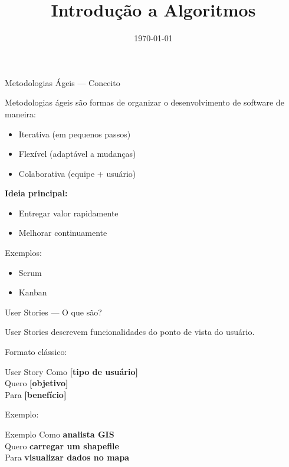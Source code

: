\documentclass{beamer}
\title{Introdução a Algoritmos}
\date{\today}
\begin{document}
    


\begin{frame}{Metodologias Ágeis — Conceito}
    
    Metodologias ágeis são formas de organizar o desenvolvimento de software de maneira:
    
    \begin{itemize}
        \item Iterativa (em pequenos passos)
        \item Flexível (adaptável a mudanças)
        \item Colaborativa (equipe + usuário)
    \end{itemize}
    
    \vspace{0.4cm}
    
    \textbf{Ideia principal:}
    
    \begin{itemize}
        \item Entregar valor rapidamente
        \item Melhorar continuamente
    \end{itemize}
    
    \vspace{0.4cm}
    
    Exemplos:
    
    \begin{itemize}
        \item Scrum
        \item Kanban
    \end{itemize}
    
\end{frame}

\begin{frame}{User Stories — O que são?}
    
    User Stories descrevem funcionalidades do ponto de vista do usuário.
    
    \vspace{0.4cm}
    
    Formato clássico:
    
    \begin{block}{User Story}
        Como \textbf{[tipo de usuário]} \\
        Quero \textbf{[objetivo]} \\
        Para \textbf{[benefício]}
    \end{block}
    
    \vspace{0.4cm}
    
    Exemplo:
    
    \begin{block}{Exemplo}
        Como \textbf{analista GIS} \\
        Quero \textbf{carregar um shapefile} \\
        Para \textbf{visualizar dados no mapa}
    \end{block}
    
\end{frame}
\end{document}
